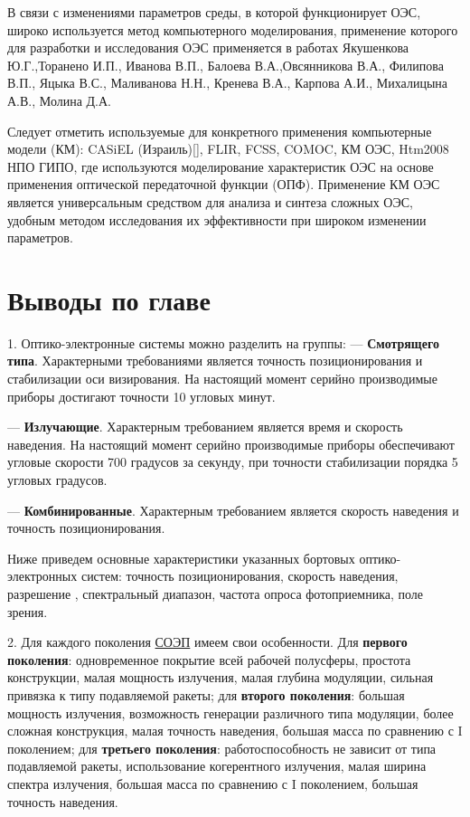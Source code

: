 В связи с изменениями параметров среды, в которой функционирует ОЭС, широко используется метод компьютерного моделирования, применение которого для разработки и исследования ОЭС применяется в работах Якушенкова Ю.Г.,Торанено И.П., Иванова В.П., Балоева В.А.,Овсянникова В.А., Филипова В.П., Яцыка В.С., Маливанова Н.Н., Кренева В.А., Карпова А.И., Михалицына А.В., Молина Д.А.

Следует отметить используемые для конкретного применения компьютерные модели (КМ): CASiEL (Израиль)[], FLIR, FCSS, COMOC, КМ ОЭС, Htm2008 НПО ГИПО, где используются моделирование характеристик ОЭС на основе применения оптической передаточной функции (ОПФ). Применение КМ ОЭС является универсальным средством для анализа  и синтеза сложных ОЭС, удобным методом исследования их эффективности при широком изменении параметров.


\section{Выводы по главе} \label{sec:ch1/sec4-}

1. Оптико-электронные системы можно разделить на группы:
--- \textbf{Смотрящего типа}. Характерными требованиями является точность позиционирования и стабилизации оси визирования. На настоящий момент серийно производимые приборы достигают точности 10 угловых минут.
	
--- \textbf{Излучающие}. Характерным требованием является время и скорость наведения. На настоящий момент серийно производимые приборы обеспечивают угловые скорости 700 градусов за секунду, при точности стабилизации порядка 5 угловых градусов.
	
--- \textbf{Комбинированные}. Характерным требованием является скорость наведения и точность позиционирования.
	

Ниже приведем основные характеристики указанных бортовых оптико-электронных систем: точность позиционирования, скорость наведения, разрешение , спектральный диапазон, частота опроса фотоприемника, поле зрения.


2. Для каждого поколения  \hyperref[acroSOEP]{СОЭП} имеем свои особенности. Для \textbf{первого поколения}: одновременное покрытие всей рабочей полусферы, простота конструкции, малая мощность излучения, малая глубина модуляции, сильная привязка к типу подавляемой ракеты; для \textbf{второго поколения}: большая мощность излучения, возможность генерации различного типа модуляции, более сложная конструкция, малая точность наведения, большая масса по сравнению с I поколением; для \textbf{третьего поколения}: работоспособность не зависит от типа подавляемой ракеты, использование когерентного излучения, малая ширина спектра излучения, большая масса по сравнению с I поколением, большая точность наведения.

